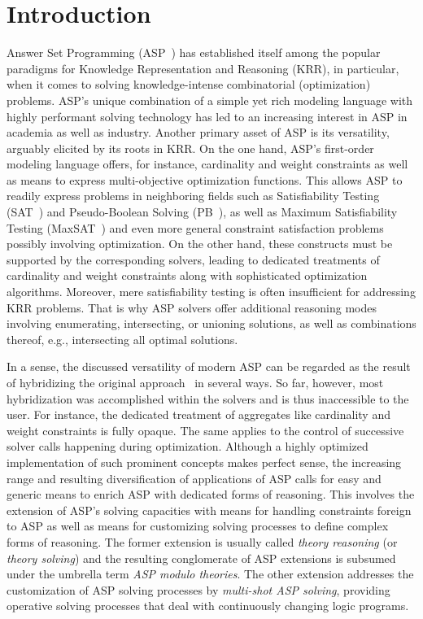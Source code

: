 
\section{Introduction}\label{sec:introduction}

Answer Set Programming (ASP~\cite{baral02a}) has established itself among the popular paradigms for Knowledge Representation and Reasoning (KRR),
in particular, when it comes to solving knowledge-intense combinatorial (optimization) problems.
ASP's unique combination of a simple yet rich modeling language with highly performant solving technology
has led to an increasing interest in ASP in academia as well as industry.
Another primary asset of ASP is its versatility, arguably elicited by its roots in KRR.
On the one hand,
ASP's first-order modeling language offers, for instance, cardinality and weight constraints
as well as means to express multi-objective optimization functions.
This allows ASP to readily express problems in neighboring fields such as
Satisfiability Testing (SAT~\cite{SATHandbook})
and
Pseudo-Boolean Solving (PB~\cite{rouman09a}),
as well as
Maximum Satisfiability Testing (MaxSAT~\cite{liman09a})
and even
more general constraint satisfaction problems possibly involving optimization.
On the other hand,
these constructs must be supported by the corresponding solvers,
leading to dedicated treatments of cardinality and weight constraints
along with sophisticated optimization algorithms.
Moreover, mere satisfiability testing is often insufficient for addressing KRR problems.
That is why ASP solvers offer additional reasoning modes involving enumerating, intersecting, or unioning solutions,
as well as combinations thereof, e.g., intersecting all optimal solutions.

In a sense,
the discussed versatility of modern ASP can be regarded as the result of hybridizing the original approach~\cite{gellif88b} in several ways.
So far, however, most hybridization was accomplished within the solvers and is thus inaccessible to the user.
For instance, the dedicated treatment of aggregates like cardinality and weight constraints is fully opaque.
The same applies to the control of successive solver calls happening during optimization.
Although a highly optimized implementation of such prominent concepts makes perfect sense,
the increasing range and resulting diversification of applications of ASP
calls for easy and generic means to enrich ASP with dedicated forms of reasoning.
This involves
the extension of ASP's solving capacities with means for handling constraints foreign to ASP
as well as
means for customizing solving processes to define complex forms of reasoning.
The former extension is usually called \emph{theory reasoning} (or \emph{theory solving}) and
the resulting conglomerate of ASP extensions is subsumed under the umbrella term \emph{ASP modulo theories}.
The other extension addresses the customization of ASP solving processes by \emph{multi-shot ASP solving},
providing operative solving processes that deal with continuously changing logic programs.

